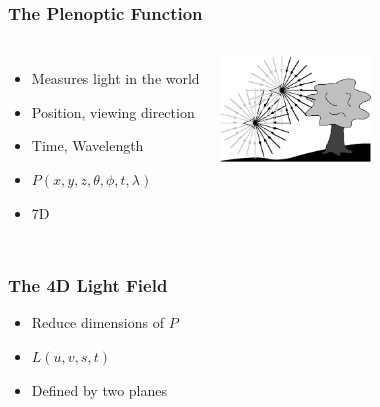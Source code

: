 \documentclass[12pt, compress]{beamer}
\begin{document}
\begin{frame}[fragile]
	\frametitle{The Plenoptic Function}
	
	\begin{columns}[onlytextwidth]
			\begin{itemize}[<alert@+>]
				\item Measures light in the world
				\item Position, viewing direction
				\item Time, Wavelength
				\item $P(x, y, z, \theta, \phi, t, \lambda)$
				\item 7D
			\end{itemize}
			\vspace{-5cm}
			\includegraphics[width = 4cm]{images/plenoptic.png}
	\end{columns}
	
\end{frame}

\begin{frame}[fragile]
	\frametitle{The 4D Light Field}
	
	\begin{itemize}[<alert@+>]
		\item Reduce dimensions of $P$
		\item $L(u, v, s, t)$
		\item Defined by two planes
	\end{itemize}
	\begin{center}
	\end{center}
\end{frame}
\end{document}

